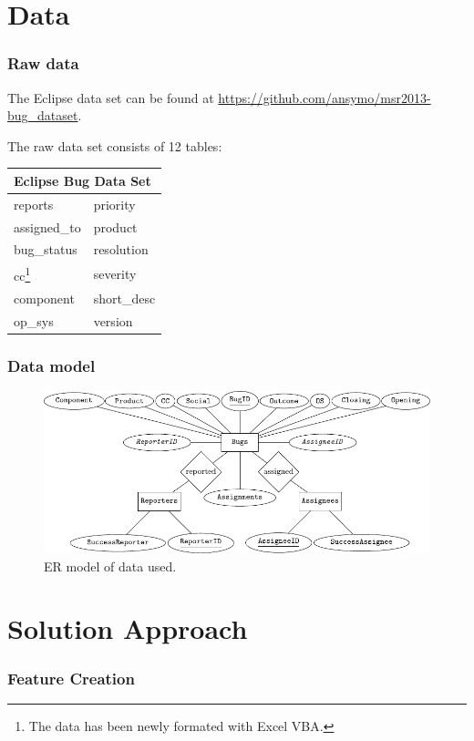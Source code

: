 \documentclass[xcolor=sgvnames,serifs,notes,compress,professionalfont]{beamer}
\begin{document}
\section{Data}
\begin{frame}
\frametitle{Raw data}
The Eclipse data set can be found at
\url{https://github.com/ansymo/msr2013-bug_dataset}.

The raw data set consists of 12 tables:
\begin{table}
	\centering
	\begin{tabular}{|l|l|}
		\hline
		\multicolumn{2}{|l|}{Eclipse Bug Data Set}\\
		\hline
		reports & priority\\
		assigned\_to & product\\
		bug\_status & resolution\\
		cc\footnote{The data has been newly formated with Excel VBA.} & severity\\
		component & short\_desc\\
		op\_sys & version\\
		\hline 
	\end{tabular}
\end{table}	

\end{frame}

\begin{frame}
\frametitle{Data model}
\begin{figure}
\includegraphics[width=\textwidth]{pictures/ERDiagram/ERDiagram.pdf}    
\caption{ER model of data used.}
\end{figure}
\end{frame}

\section{Solution Approach}
\begin{frame}
\frametitle{Feature Creation}

\end{frame}
\end{document}
